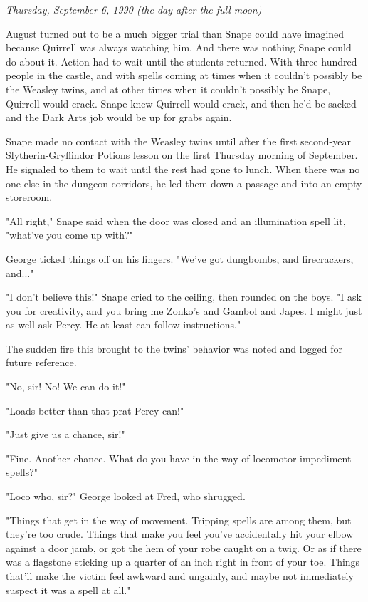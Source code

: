 \documentclass[a4paper,11pt]{article}
\begin{document}
\emph{Thursday, September 6, 1990 (the day after the full moon)}

August turned out to be a much bigger trial than Snape could have imagined because Quirrell was always watching him. And there was nothing Snape could do about it. Action had to wait until the students returned. With three hundred people in the castle, and with spells coming at times when it couldn't possibly be the Weasley twins, and at other times when it couldn't possibly be Snape, Quirrell would crack. Snape knew Quirrell would crack, and then he'd be sacked and the Dark Arts job would be up for grabs again.

Snape made no contact with the Weasley twins until after the first second-year Slytherin-Gryffindor Potions lesson on the first Thursday morning of September. He signaled to them to wait until the rest had gone to lunch. When there was no one else in the dungeon corridors, he led them down a passage and into an empty storeroom.

"All right," Snape said when the door was closed and an illumination spell lit, "what've you come up with?"

George ticked things off on his fingers. "We've got dungbombs, and firecrackers, and..."

"I don't believe this!" Snape cried to the ceiling, then rounded on the boys. "I ask you for creativity, and you bring me Zonko's and Gambol and Japes. I might just as well ask Percy. He at least can follow instructions."

The sudden fire this brought to the twins' behavior was noted and logged for future reference.

"No, sir! No! We can do it!"

"Loads better than that prat Percy can!"

"Just give us a chance, sir!"

"Fine. Another chance. What do you have in the way of locomotor impediment spells?"

"Loco who, sir?" George looked at Fred, who shrugged.

"Things that get in the way of movement. Tripping spells are among them, but they're too crude. Things that make you feel you've accidentally hit your elbow against a door jamb, or got the hem of your robe caught on a twig. Or as if there was a flagstone sticking up a quarter of an inch right in front of your toe. Things that'll make the victim feel awkward and ungainly, and maybe not immediately suspect it was a spell at all."
\end{document}
